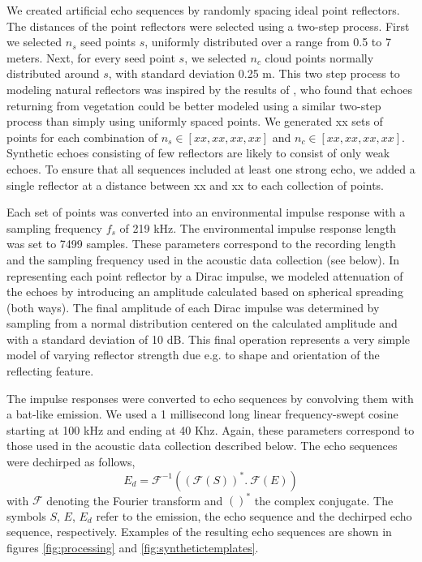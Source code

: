 \documentclass[preprint,5p]{elsarticle}
\begin{document}
We created artificial echo sequences by randomly spacing ideal point reflectors. The distances of the point reflectors were selected using a two-step process. First we selected $n_{s}$ seed points $s$, uniformly distributed over a range from 0.5 to 7 meters. Next, for every seed point $s$, we selected $n_{c}$ cloud points normally distributed around $s$, with standard deviation 0.25 m. This two step process to modeling natural reflectors was inspired by the results of \citet{Yovel2009}, who found that echoes returning from vegetation could be better modeled using a similar two-step process than simply using uniformly spaced points. We generated xx sets of points for each combination of $n_s \in [xx,xx,xx, xx]$ and $n_c \in [xx, xx, xx, xx]$. Synthetic echoes consisting of few reflectors are likely to consist of only weak echoes. To ensure that all sequences included at least one strong echo, we added a single reflector at a distance between xx and xx to each collection of points.

Each set of points was converted into an environmental impulse response with a sampling frequency $f_s$ of 219 kHz. The environmental impulse response length was set to 7499 samples. These parameters correspond to the recording length and the sampling frequency used in the acoustic data collection (see below). In representing each point reflector by a Dirac impulse, we modeled attenuation of the echoes by introducing an amplitude calculated based on spherical spreading (both ways). The final amplitude of each Dirac impulse was determined by sampling from a normal distribution centered on the calculated amplitude and with a standard deviation of 10 dB. This final operation represents a very simple model of varying reflector strength due e.g. to shape and orientation of the reflecting feature.

The impulse responses were converted to echo sequences by convolving them with a bat-like emission. We used a 1 millisecond long linear frequency-swept cosine starting at 100 kHz and ending at 40 Khz. Again, these parameters correspond to those used in the acoustic data collection described below. The echo sequences were dechirped as follows, 
%
%
\begin{equation}\label{key}
E_d = \mathcal{F}^{-1}((\mathcal{F}(S))^* . \ \mathcal{F}(E))
\end{equation}
with $\mathcal{F}$ denoting the Fourier transform and $()^*$ the complex conjugate. The symbols $S$, $E$, $E_d$ refer to the emission, the echo sequence and the dechirped echo sequence, respectively. Examples of the resulting echo sequences are shown in figures \ref{fig:processing} and \ref{fig:synthetictemplates}. 
\end{document}
